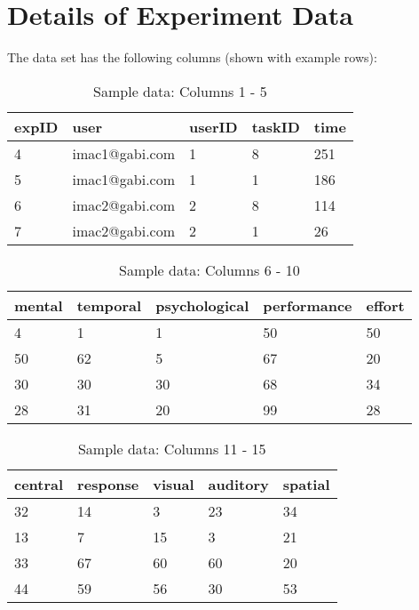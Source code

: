 
\chapter{Details of Experiment Data} %

\label{AppendixA} %


The data set has the following columns (shown with example rows):

\begin{table}[]
\begin{center}
  \begin{tabular}{ | l | l | l | l | l | }
    \hline
expID & user & userID & taskID & time \\ \hline
4 & imac1@gabi.com & 1 & 8 & 251 \\
5 & imac1@gabi.com & 1 & 1 & 186 \\
6 & imac2@gabi.com & 2 & 8 & 114 \\
7 & imac2@gabi.com & 2 & 1 & 26 \\
    \hline
  \end{tabular}
\end{center}
\caption{Sample data: Columns 1 - 5}
\label{tab:my_label}
\end{table}

\begin{table}[]
\begin{center}
  \begin{tabular}{ | l | l | l | l | l | }
    \hline
mental & temporal & psychological & performance & effort \\ \hline 
4 & 1 & 1 & 50 & 50 \\
50 & 62 & 5 & 67 & 20\\
30 & 30 & 30 & 68 & 34\\
28 & 31 & 20 & 99 & 28\\
    \hline
  \end{tabular}
\end{center}
\caption{Sample data: Columns 6 - 10}
\label{tab:my_label}
\end{table}

\begin{table}[]
\begin{center}
  \begin{tabular}{ | l | l | l | l | l | }
    \hline
central & response & visual & auditory & spatial\\ \hline 
32 & 14 & 3 & 23 & 34 \\
13 & 7 & 15 & 3 & 21\\
33 & 67 & 60 & 60 & 20 \\
44 & 59 & 56 & 30 & 53 \\
    \hline
  \end{tabular}
\end{center}
\caption{Sample data: Columns 11 - 15}
\label{tab:my_label}
\end{table}

